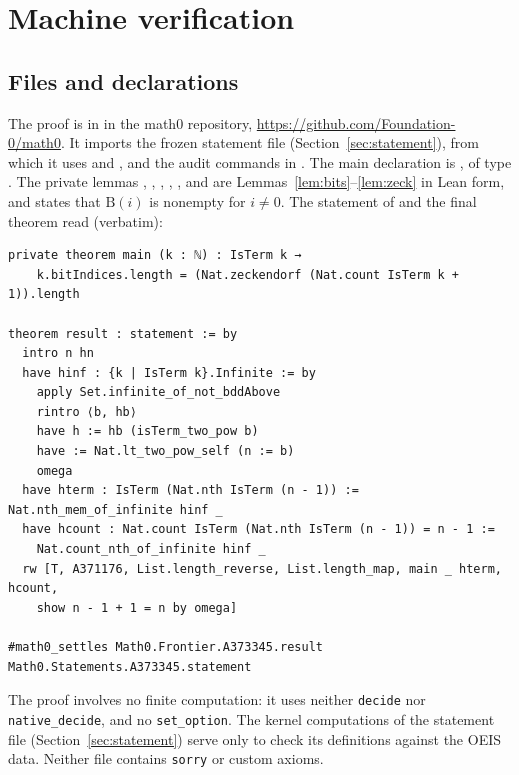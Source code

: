 \documentclass[11pt]{amsart}
\theoremstyle{plain}
\theoremstyle{definition}
\newcommand{\Bits}{\mathrm{B}}
\begin{document}
\section{Machine verification}\label{sec:lean}

\subsection*{Files and declarations}
The proof is in  in the math0 repository, \url{https://github.com/Foundation-0/math0}. It imports the frozen statement file  (Section~\ref{sec:statement}), from which it uses  and , and the audit commands in . The main declaration is , of type . The private lemmas , , , , ,  and  are Lemmas~\ref{lem:bits}--\ref{lem:zeck} in Lean form, and  states that $\Bits(i)$ is nonempty for $i\ne0$. The statement of  and the final theorem read (verbatim):
\begin{lstlisting}
private theorem main (k : ℕ) : IsTerm k →
    k.bitIndices.length = (Nat.zeckendorf (Nat.count IsTerm k + 1)).length

theorem result : statement := by
  intro n hn
  have hinf : {k | IsTerm k}.Infinite := by
    apply Set.infinite_of_not_bddAbove
    rintro ⟨b, hb⟩
    have h := hb (isTerm_two_pow b)
    have := Nat.lt_two_pow_self (n := b)
    omega
  have hterm : IsTerm (Nat.nth IsTerm (n - 1)) := Nat.nth_mem_of_infinite hinf _
  have hcount : Nat.count IsTerm (Nat.nth IsTerm (n - 1)) = n - 1 :=
    Nat.count_nth_of_infinite hinf _
  rw [T, A371176, List.length_reverse, List.length_map, main _ hterm, hcount,
    show n - 1 + 1 = n by omega]

#math0_settles Math0.Frontier.A373345.result Math0.Statements.A373345.statement
\end{lstlisting}
The proof involves no finite computation: it uses neither \texttt{decide} nor \texttt{native\_decide}, and no \texttt{set\_option}. The kernel computations of the statement file (Section~\ref{sec:statement}) serve only to check its definitions against the OEIS data. Neither file contains \texttt{sorry} or custom axioms.
\end{document}
